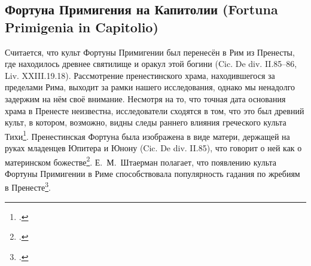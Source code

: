 

\subsection{Фортуна Примигения на Капитолии (Fortuna Primigenia in Capitolio)}\label{FortunaPrimigeniaInCapitolio}

Считается, что культ Фортуны Примигении был перенесён в Рим из Пренесты, где находилось древнее святилище и оракул этой богини (Cic. De div. II.85--86, Liv. XXIII.19.18). Рассмотрение пренестинского храма, находившегося за пределами Рима, выходит за рамки нашего исследования, однако мы ненадолго задержим на нём своё внимание. Несмотря на то, что точная дата основания храма в Пренесте неизвестна, исследователи сходятся в том, что это был древний культ, в котором, возможно, видны следы раннего влияния греческого культа Тихи\footcites[S. 211]{Wissowa1902}[P. 171]{Rose1959}[S. 176]{Latte1960}. Пренестинская Фортуна была изображена в виде матери, держащей на руках младенцев Юпитера и Юнону (Cic. De div. II.85), что говорит о ней как о материнском божестве\footcites[S. 209--211]{Wissowa1902}[P. 165--166, 223--224]{Fowler1899}[P. 268]{Altheim1938}[С. 73]{Nemirovsky1964}. Е.~М.~Штаерман полагает, что появлению культа Фортуны Примигении в Риме способствовала популярность гадания по жребиям в Пренесте\footcite[С. 128]{Shtaerman1987}. %

